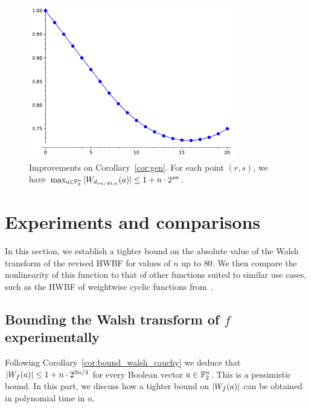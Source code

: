 \documentclass[11pt]{llncs}
\begin{document}
\begin{figure}
	\centering
	\includegraphics[width=9cm]{walsh_bounds_generalization.pdf}
	\caption{Improvements on Corollary~\ref{cor:gen}. For each point $(r,s)$, we have $\max_{a\in\mathbb{F}_2^n}|W_{d_{ r n/40,n}}(a)|\leq 1+n\cdot 2^{s n}$.}
    \label{fig:walsh_bounds_generalization}
\end{figure}

\section{Experiments and comparisons}

In this section, we establish a tighter bound on the absolute value of the Walsh transform of the revised HWBF for values of $n$ up to $80$. 
We then compare the nonlinearity of this function to that of other functions suited to similar use cases, such as the HWBF of weightwise cyclic functions from~\cite{DAM:MeaOza24}.



\subsection{Bounding the Walsh transform of $f$ experimentally}\label{sec:expwt}


Following Corollary~\ref{cor:bound_walsh_cauchy} we deduce that $|W_{f}(a)|\leq 1+n\cdot 2^{3n/4}$ for every Boolean vector $a\in\mathbb{F}_2^n$. This is a pessimistic bound. In this part, we discuss how a tighter bound on $|W_{f}(a)|$ can be obtained in polynomial time in $n$.
\end{document}
